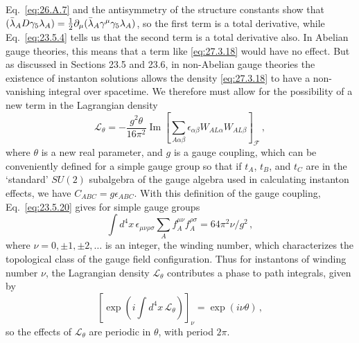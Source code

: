 Eq.~\eqref{eq:26.A.7} and the antisymmetry of the structure constants
show that
\((\bar\lambda_A\sl{D}\gamma_5\lambda_A)
=\tfrac12\partial_\mu(\bar\lambda_A\gamma^\mu\gamma_5\lambda_A)\),
so the first term is a total derivative, while Eq.~\eqref{eq:23.5.4}
tells us that the second term is a total derivative also. In Abelian gauge
theories, this means that a term like \eqref{eq:27.3.18} would have no
effect. But as discussed in Sections 23.5 and 23.6, in non-Abelian gauge
theories the existence of instanton solutions allows the density
\eqref{eq:27.3.18} to have a non-vanishing integral over spacetime. We
therefore must allow for the possibility of a new term in the Lagrangian
density
\begin{equation}
  \mathcal{L}_\theta
  =-\frac{g^2\theta}{16\pi^2}
  \operatorname{Im}\left[
    \sum_{A\alpha\beta}
    \epsilon_{\alpha\beta}W_{AL\alpha}W_{AL\beta}
  \right]_{\mathcal{F}}\,,
  \tag{27.3.19}\label{eq:27.3.19}
\end{equation}
where \(\theta\) is a new real parameter, and \(g\) is a gauge coupling,
which can be conveniently defined for a simple gauge group so that if
\(t_A\), \(t_B\), and \(t_C\) are in the `standard' \(SU(2)\) subalgebra
of the gauge algebra used in calculating instanton effects, we have
\(C_{ABC}=g\epsilon_{ABC}\). With this definition of the gauge coupling,
Eq.~\eqref{eq:23.5.20} gives for simple gauge groups
\begin{equation}
  \int d^4x\,\epsilon_{\mu\nu\rho\sigma}
  \sum_A f_A^{\mu\nu}f_A^{\rho\sigma}
  =64\pi^2\nu/g^2\,,
  \tag{27.3.20}\label{eq:27.3.20}
\end{equation}
where \(\nu=0,\mathbin{\pm}1,\mathbin{\pm}2,\ldots\) is an integer, the
winding number, which characterizes the topological class of the gauge
field configuration. Thus for instantons of winding number \(\nu\), the
Lagrangian density \(\mathcal{L}_\theta\) contributes a phase to path
integrals, given by
\begin{equation}
  \left[
    \exp\left(i\int d^4x\,\mathcal{L}_\theta\right)
  \right]_\nu
  =\exp(i\nu\theta)\,,
  \tag{27.3.21}\label{eq:27.3.21}
\end{equation}
so the effects of \(\mathcal{L}_\theta\) are periodic in \(\theta\), with
period \(2\pi\).

